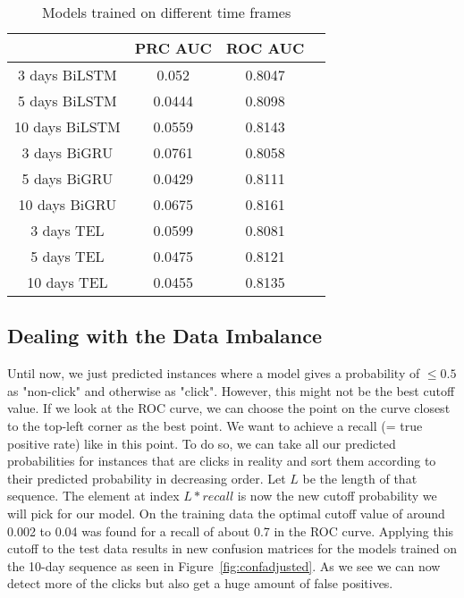 \documentclass[utf8x]{ctexart}
\begin{document}
\begin{table}[ht]
  \centering
  \caption{Models trained on different time frames}
  \label{tab:time_comparison}
  \begin{tabular}{c|ccc}
                   & PRC AUC & ROC AUC \\
    \hline
    3 days BiLSTM  & 0.052   & 0.8047  \\
    5 days BiLSTM  & 0.0444  & 0.8098  \\
    10 days BiLSTM & 0.0559  & 0.8143  \\
    \hline
    3 days BiGRU   & 0.0761  & 0.8058  \\
    5 days BiGRU   & 0.0429  & 0.8111  \\
    10 days BiGRU  & 0.0675  & 0.8161  \\
    \hline
    3 days TEL     & 0.0599  & 0.8081  \\
    5 days TEL     & 0.0475  & 0.8121  \\
    10 days TEL    & 0.0455  & 0.8135  \\
  \end{tabular}
\end{table}

\subsection{Dealing with the Data Imbalance}

Until now, we just predicted instances where a model gives a probability of $\leq 0.5$ as "non-click" and otherwise as "click". However, this might not be the best cutoff value. If we look at the ROC curve, we can choose the point on the curve closest to the top-left corner as the best point. We want to achieve a recall (= true positive rate) like in this point. To do so, we can take all our predicted probabilities for instances that are clicks in reality and sort them according to their predicted probability in decreasing order. Let $L$ be the length of that sequence. The element at index $L * recall$ is now the new cutoff probability we will pick for our model. On the training data the optimal cutoff value of around 0.002 to 0.04 was found for a recall of about 0.7 in the ROC curve.
Applying this cutoff to the test data results in new confusion matrices for the models trained on the 10-day sequence as seen in Figure~\ref{fig:confadjusted}. As we see we can now detect more of the clicks but also get a huge amount of false positives.
\end{document}
